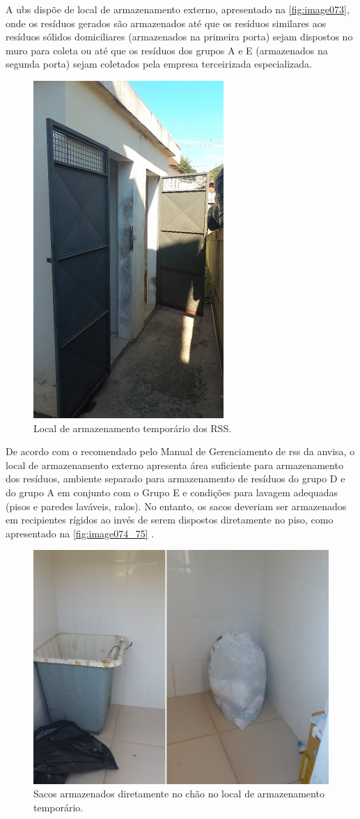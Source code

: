 A \gls{ubs} dispõe de local de armazenamento externo, apresentado na \autoref{fig:image073}, onde os resíduos gerados são armazenados até que os resíduos similares aos resíduos sólidos domiciliares (armazenados na primeira porta) sejam dispostos no muro para coleta ou até que os resíduos dos grupos A e E (armazenados na segunda porta) sejam coletados pela empresa terceirizada especializada.

\begin{figure}
	\centering
	\includegraphics[width=0.40\linewidth]{produtos/prodtres/image073}
	\caption{Local de armazenamento temporário dos RSS.}
	\label{fig:image073}
\end{figure}


De acordo com o recomendado pelo Manual de Gerenciamento de \gls{rss} da \gls{anvisa}, o local de armazenamento externo apresenta área suficiente para armazenamento dos resíduos, ambiente separado para armazenamento de resíduos do grupo D e do grupo A em conjunto com o Grupo E e condições para lavagem adequadas (pisos e paredes laváveis, ralos). No entanto, os sacos deveriam ser armazenados em recipientes rígidos ao invés de serem dispostos diretamente no piso, como apresentado na \autoref{fig:image074_75} \cite{anvisa:2006}.

\begin{figure}
	\centering
	\includegraphics[width=0.75\linewidth]{produtos/prodtres/image074_75}
	\caption{Sacos armazenados diretamente no chão no local de armazenamento temporário.}
	\label{fig:image074_75}
\end{figure}


